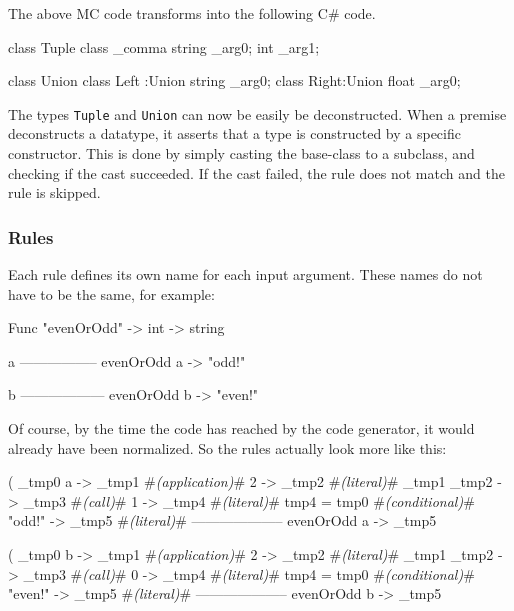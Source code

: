 The above MC code transforms into the following C\# code.

\begin{CS}
class Tuple{}
class _comma { string _arg0; int _arg1;}

class Union{}
class Left :Union {string _arg0;}
class Right:Union {float  _arg0;}
\end{CS}

The types \verb|Tuple| and \verb|Union| can now be easily be deconstructed.
When a premise deconstructs a datatype, it asserts that a type is constructed by a specific constructor.
This is done by simply casting the base-class to a subclass, and checking if the cast succeeded.
If the cast failed, the rule does not match and the rule is skipped.

\subsubsection{Rules}\label{codegen_rules}

Each rule defines its own name for each input argument.
These names do not have to be the same, for example:

\begin{MC}
    Func "evenOrOdd" -> int -> string
    
    a%
    -----------------
    evenOrOdd a -> "odd!"

    b%
    ------------------
    evenOrOdd b -> "even!"
\end{MC}

Of course, by the time the code has reached by the code generator, it would already have been normalized.
So the rules actually look more like this:

\begin{MC}[escapeinside=\#\#]
    (%
    _tmp0 a -> _tmp1     #\textit{(application)}#
    2 -> _tmp2           #\textit{(literal)}#
    _tmp1 _tmp2 -> _tmp3 #\textit{(call)}#
    1 -> _tmp4           #\textit{(literal)}#
    tmp4 = tmp0          #\textit{(conditional)}#
    "odd!" -> _tmp5      #\textit{(literal)}#
    --------------------
    evenOrOdd a -> _tmp5
\end{MC}

\begin{MC}[escapeinside=\#\#]
    (%
    _tmp0 b -> _tmp1     #\textit{(application)}#
    2 -> _tmp2           #\textit{(literal)}#
    _tmp1 _tmp2 -> _tmp3 #\textit{(call)}#
    0 -> _tmp4           #\textit{(literal)}#
    tmp4 = tmp0          #\textit{(conditional)}#
    "even!" -> _tmp5     #\textit{(literal)}#
    --------------------
    evenOrOdd b -> _tmp5
\end{MC}

